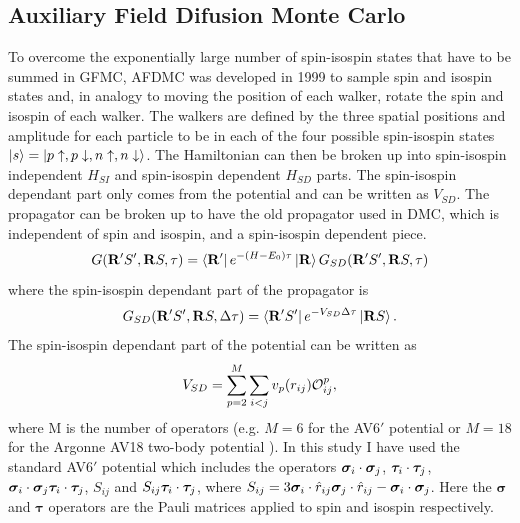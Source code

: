 \subsection{Auxiliary Field Difusion Monte Carlo}
\label{sec:AFDMC}
To overcome the exponentially large number of spin-isospin states that have to be summed in GFMC, AFDMC was developed in 1999 \cite{schmidt1999} to sample spin and isospin states and, in analogy to moving the position of each walker, rotate the spin and isospin of each walker. The walkers are defined by the three spatial positions and amplitude for each particle to be in each of the four possible spin-isospin states $\left| s \right> = \left| p\uparrow,p\downarrow,n\uparrow,n\downarrow \right>$. The Hamiltonian can then be broken up into spin-isospin independent $H_{SI}$ and spin-isospin dependent $H_{SD}$ parts. The spin-isospin dependant part only comes from the potential and can be written as $V_{SD}$. The propagator can be broken up to have the old propagator used in DMC, which is independent of spin and isospin, and a spin-isospin dependent piece.
\begin{equation}
   G(\mathbf{R}'S',\mathbf{R} S,\tau)=\left< \mathbf{R}' \right|e^{-(H-E_0)\tau}\left| \mathbf{R} \right>G_{SD}(\mathbf{R}'S',\mathbf{R} S,\tau)
\end{equation}
where the spin-isospin dependant part of the propagator is
\begin{equation}
   G_{SD}(\mathbf{R}'S',\mathbf{R} S,\Delta\tau) = \left< \mathbf{R}'S' \right|e^{-V_{SD}\Delta\tau} \left| \mathbf{R} S \right>.
\end{equation}
The spin-isospin dependant part of the potential can be written as
\begin{equation}
   V_{SD} = \sum\limits_{p=2}^{M}\sum\limits_{i<j} v_p(r_{ij})\mathcal{O}_{ij}^p,
\end{equation}
where M is the number of operators (e.g. $M=6$ for the AV6$'$ potential or $M=18$ for the Argonne AV18 two-body potential \cite{wiringa1984}). In this study I have used the standard AV6$'$ potential which includes the operators $\bm{\sigma}_i\cdot\bm{\sigma}_j$, $\bm{\tau}_i\cdot\bm{\tau}_j$, $\bm{\sigma}_i\cdot\bm{\sigma}_j \bm{\tau}_i\cdot\bm{\tau}_j$, $S_{ij}$ and $S_{ij} \bm{\tau}_i\cdot\bm{\tau}_j$, where $S_{ij} = 3\bm{\sigma}_i\cdot\hat{r}_{ij}\bm{\sigma}_j\cdot\hat{r}_{ij}-\bm{\sigma}_i\cdot\bm{\sigma}_j$. Here the $\mathbf{\sigma}$ and $\mathbf{\tau}$ operators are the Pauli matrices applied to spin and isospin respectively.













